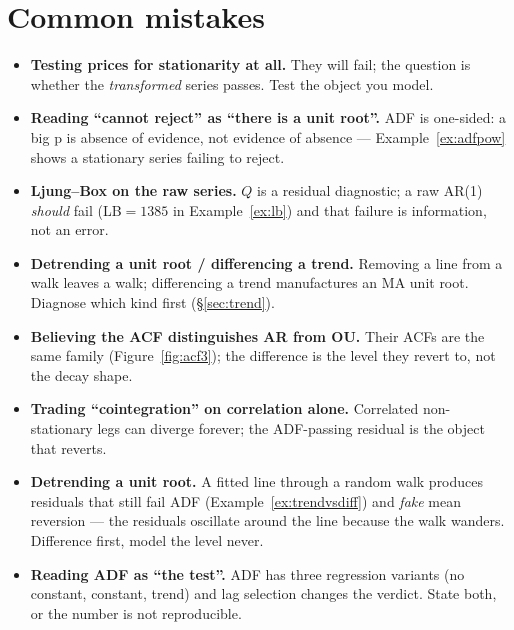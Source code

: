 \section{Common mistakes}
\begin{itemize}
\item \textbf{Testing prices for stationarity at all.} They will
fail; the question is whether the \emph{transformed} series passes.
Test the object you model.
\item \textbf{Reading ``cannot reject'' as ``there is a unit
root''.} ADF is one-sided: a big p is absence of evidence, not
evidence of absence --- Example~\ref{ex:adfpow} shows a stationary
series failing to reject.
\item \textbf{Ljung--Box on the raw series.} $Q$ is a residual
diagnostic; a raw AR(1) \emph{should} fail (LB$=1385$ in
Example~\ref{ex:lb}) and that failure is information, not an error.
\item \textbf{Detrending a unit root / differencing a trend.}
Removing a line from a walk leaves a walk; differencing a trend
manufactures an MA unit root. Diagnose which kind first
(\S\ref{sec:trend}).
\item \textbf{Believing the ACF distinguishes AR from OU.} Their
ACFs are the same family (Figure~\ref{fig:acf3}); the difference is
the level they revert to, not the decay shape.
\item \textbf{Trading ``cointegration'' on correlation alone.}
Correlated non-stationary legs can diverge forever; the ADF-passing
residual is the object that reverts.
\item \textbf{Detrending a unit root.} A fitted line through a
random walk produces residuals that still fail ADF
(Example~\ref{ex:trendvsdiff}) and \emph{fake} mean reversion ---
the residuals oscillate around the line because the walk wanders.
Difference first, model the level never.
\item \textbf{Reading ADF as ``the test''.} ADF has three regression
variants (no constant, constant, trend) and lag selection changes
the verdict. State both, or the number is not reproducible.
\end{itemize}

